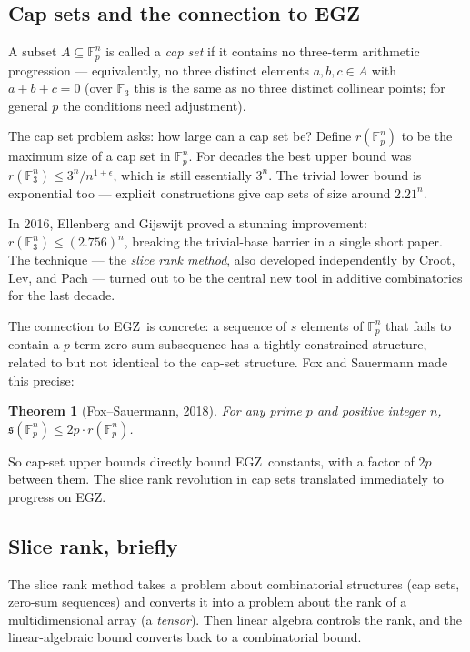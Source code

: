 \documentclass[11pt,a4paper]{article}
\theoremstyle{plain}
\newtheorem{theorem}{Theorem}[section]
\theoremstyle{definition}
\theoremstyle{remark}
\newcommand{\F}{\mathbb{F}}
\newcommand{\sUFp}{\mathfrak{s}}
\newcommand{\EGZ}{\textsf{EGZ}}
\begin{document}
\subsection{Cap sets and the connection to \EGZ}

A subset $A \subseteq \F_p^n$ is called a \emph{cap set} if it contains no three-term arithmetic progression --- equivalently, no three distinct elements $a, b, c \in A$ with $a + b + c = 0$ (over $\F_3$ this is the same as no three distinct collinear points; for general $p$ the conditions need adjustment).

The cap set problem asks: how large can a cap set be? Define $r(\F_p^n)$ to be the maximum size of a cap set in $\F_p^n$. For decades the best upper bound was $r(\F_3^n) \leq 3^n / n^{1+\epsilon}$, which is still essentially $3^n$. The trivial lower bound is exponential too --- explicit constructions give cap sets of size around $2.21^n$.

In 2016, Ellenberg and Gijswijt proved a stunning improvement: $r(\F_3^n) \leq (2.756)^n$, breaking the trivial-base barrier in a single short paper. The technique --- the \emph{slice rank method}, also developed independently by Croot, Lev, and Pach --- turned out to be the central new tool in additive combinatorics for the last decade.

The connection to \EGZ\ is concrete: a sequence of $s$ elements of $\F_p^n$ that fails to contain a $p$-term zero-sum subsequence has a tightly constrained structure, related to but not identical to the cap-set structure. Fox and Sauermann made this precise:

\begin{theorem}[Fox--Sauermann, 2018]
\label{thm:fox-sauermann}
For any prime $p$ and positive integer $n$, $\sUFp(\F_p^n) \leq 2p \cdot r(\F_p^n)$.
\end{theorem}

So cap-set upper bounds directly bound \EGZ\ constants, with a factor of $2p$ between them. The slice rank revolution in cap sets translated immediately to progress on \EGZ.

\subsection{Slice rank, briefly}

The slice rank method takes a problem about combinatorial structures (cap sets, zero-sum sequences) and converts it into a problem about the rank of a multidimensional array (a \emph{tensor}). Then linear algebra controls the rank, and the linear-algebraic bound converts back to a combinatorial bound.
\end{document}
